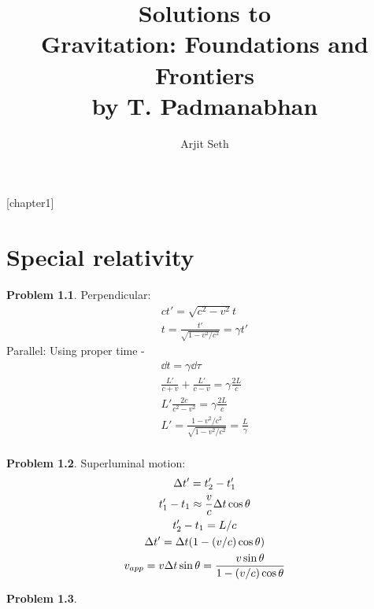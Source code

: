 \documentclass{report}
\theoremstyle{definition}
\begin{document}
\title{Solutions to \\ Gravitation: Foundations and Frontiers \\ by T. Padmanabhan}

\author{Arjit Seth}

\maketitle

\newtheorem{chapter1}{Problem}
[chapter1]

\chapter{Special relativity}

\begin{chapter1}\label{prob:1}
	Perpendicular:
	\begin{gather*}
		ct' = \sqrt{c^2 - v^2}t \\
		t = \frac{t'}{\sqrt{1 - v^2/c^2}} = \gamma t'
	\end{gather*}
	Parallel: Using proper time -
	\begin{gather*}
		\dd{t} = \gamma\dd{\tau} \\ 
		\frac{L'}{c+v} + \frac{L'}{c-v} = \gamma\frac{2L}{c} \\
		L'\frac{2c}{c^2 - v^2}  = \gamma\frac{2L}{c} \\
		L' = \frac{1-v^2/c^2}{\sqrt{1-v^2/c^2}} = \frac{L}{\gamma} \\
	\end{gather*}
\end{chapter1}

\begin{chapter1}\label{prob:2}
	Superluminal motion:
	\begin{gather*}
		\Delta t' = t_2' - t_1' \\
		t_1' - t_1 \approx \frac{v}{c}\Delta t \cos\theta \\
		t_2' - t_1 = L/c \\
		\Delta t' = \Delta t\pqty{1-(v/c)\cos\theta} \\
		v_{app} = v\Delta t \sin\theta = \frac{v\sin\theta}{1-(v/c)\cos\theta}
	\end{gather*}
\end{chapter1}

\begin{chapter1}\label{prob:3}

\end{chapter1}
\end{document}
